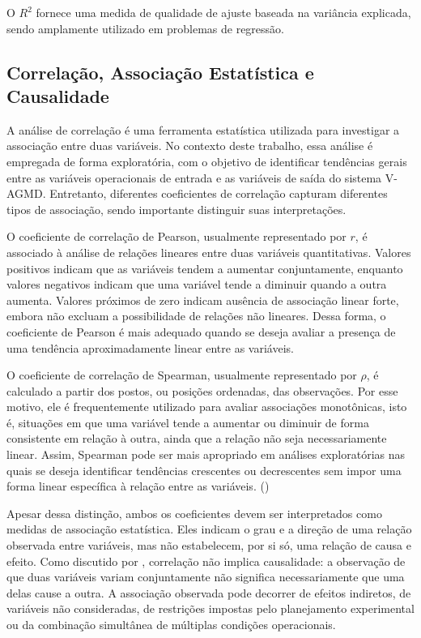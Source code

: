 O $R^2$ fornece uma medida de qualidade de ajuste baseada na variância explicada, sendo amplamente utilizado em problemas de regressão.

\subsection{Correlação, Associação Estatística e Causalidade}
\label{subsec:correlacao_associacao_causalidade}

A análise de correlação é uma ferramenta estatística utilizada para investigar a associação entre duas variáveis. No contexto deste trabalho, essa análise é empregada de forma exploratória, com o objetivo de identificar tendências gerais entre as variáveis operacionais de entrada e as variáveis de saída do sistema V-AGMD. Entretanto, diferentes coeficientes de correlação capturam diferentes tipos de associação, sendo importante distinguir suas interpretações.

O coeficiente de correlação de Pearson, usualmente representado por \(r\), é associado à análise de relações lineares entre duas variáveis quantitativas. Valores positivos indicam que as variáveis tendem a aumentar conjuntamente, enquanto valores negativos indicam que uma variável tende a diminuir quando a outra aumenta. Valores próximos de zero indicam ausência de associação linear forte, embora não excluam a possibilidade de relações não lineares. Dessa forma, o coeficiente de Pearson é mais adequado quando se deseja avaliar a presença de uma tendência aproximadamente linear entre as variáveis.

O coeficiente de correlação de Spearman, usualmente representado por \(\rho\), é calculado a partir dos postos, ou posições ordenadas, das observações. Por esse motivo, ele é frequentemente utilizado para avaliar associações monotônicas, isto é, situações em que uma variável tende a aumentar ou diminuir de forma consistente em relação à outra, ainda que a relação não seja necessariamente linear. Assim, Spearman pode ser mais apropriado em análises exploratórias nas quais se deseja identificar tendências crescentes ou decrescentes sem impor uma forma linear específica à relação entre as variáveis. (\cite{VanDenHeuvel2022Correlation})

Apesar dessa distinção, ambos os coeficientes devem ser interpretados como medidas de associação estatística. Eles indicam o grau e a direção de uma relação observada entre variáveis, mas não estabelecem, por si só, uma relação de causa e efeito. Como discutido por \cite{Holland1986StatisticsCausal}, correlação não implica causalidade: a observação de que duas variáveis variam conjuntamente não significa necessariamente que uma delas cause a outra. A associação observada pode decorrer de efeitos indiretos, de variáveis não consideradas, de restrições impostas pelo planejamento experimental ou da combinação simultânea de múltiplas condições operacionais.


